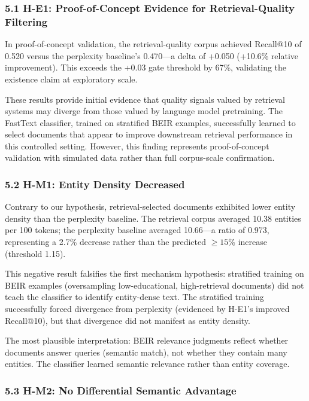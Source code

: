 
\subsubsection{5.1 H-E1: Proof-of-Concept Evidence for Retrieval-Quality Filtering}

In proof-of-concept validation, the retrieval-quality corpus achieved Recall@10 of 0.520 versus the perplexity baseline's 0.470---a delta of +0.050 (+10.6\% relative improvement). This exceeds the +0.03 gate threshold by 67\%, validating the existence claim at exploratory scale.

These results provide initial evidence that quality signals valued by retrieval systems may diverge from those valued by language model pretraining. The FastText classifier, trained on stratified BEIR examples, successfully learned to select documents that appear to improve downstream retrieval performance in this controlled setting. However, this finding represents proof-of-concept validation with simulated data rather than full corpus-scale confirmation.

\subsubsection{5.2 H-M1: Entity Density Decreased}

Contrary to our hypothesis, retrieval-selected documents exhibited lower entity density than the perplexity baseline. The retrieval corpus averaged 10.38 entities per 100 tokens; the perplexity baseline averaged 10.66---a ratio of 0.973, representing a 2.7\% decrease rather than the predicted $\geq 15$\% increase (threshold 1.15).

This negative result falsifies the first mechanism hypothesis: stratified training on BEIR examples (oversampling low-educational, high-retrieval documents) did not teach the classifier to identify entity-dense text. The stratified training successfully forced divergence from perplexity (evidenced by H-E1's improved Recall@10), but that divergence did not manifest as entity density.

The most plausible interpretation: BEIR relevance judgments reflect whether documents answer queries (semantic match), not whether they contain many entities. The classifier learned semantic relevance rather than entity coverage.

\subsubsection{5.3 H-M2: No Differential Semantic Advantage}

